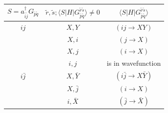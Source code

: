 \documentclass[./thesis.tex]{subfiles}
\begin{document}
\begin{table} 
	\begin{tabular}{ c|c|c }
		\hline \hline
		$S = a^\dagger_{\tilde i \tilde j} G_{\tilde p \tilde q} $                   & $\tilde r, \tilde s ; \langle S|H|G_{\tilde p \tilde q}^{\tilde r \tilde s} \rangle \neq 0$  & $\langle S|H|G_{\tilde p \tilde q}^{\tilde r \tilde s} \rangle$ \\
		\hline \hline
		\rule{0pt}{3ex}  $ij$                                                                                               & $X,Y$                                                                                        & $(ij \rightarrow XY)$                                           \\
		                                                                                                                                                                                                 & $X,i$                                                                                        & $(j \rightarrow X)$                                             \\
		                                                                                                   & $X,j$                                                                                        & $(i \rightarrow X)$                                             \\
		                                                                                                   & $i,j$                                                                                        & is in wavefunction                                              \\
		\hline
		\rule{0pt}{3ex} $i\bar{j}$                                                                                         & $X,\bar Y$                                                                                   & $(i \bar j\rightarrow X \bar Y)$                                \\ 
		                                                                                                   & $X,\bar j$                                                                                   & $(i\rightarrow X)$                                              \\ 
		                                                                                                   & $i,\bar X$                                                                                   & $(\bar j\rightarrow \bar X)$                                    \\ 

\end{tabular}
\end{table}
\end{document}

